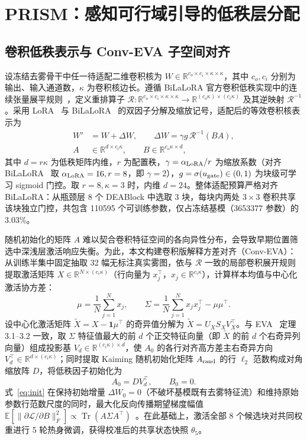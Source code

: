 \documentclass[10pt,twocolumn,letterpaper]{article}
\begin{document}
\section{PRISM：感知可行域引导的低秩层分配}
\subsection{卷积低秩表示与 Conv-EVA 子空间对齐}
设冻结去雾骨干中任一待适配二维卷积核为 $W\in\mathbb R^{c_o\times c_i\times\kappa\times\kappa}$，其中 $c_o,c_i$ 分别为输出、输入通道数，$\kappa$ 为卷积核边长。遵循 BiLaLoRA 官方卷积低秩实现中的连续张量展平规则~\cite{bilalora2026}，定义重排算子 $\mathcal R:\mathbb R^{c_o\times c_i\times\kappa\times\kappa}\to\mathbb R^{(c_o\kappa)\times(c_i\kappa)}$ 及其逆映射 $\mathcal R^{-1}$。采用 LoRA~\cite{lora2022} 与 BiLaLoRA~\cite{bilalora2026} 的双因子分解及缩放记号，适配后的等效卷积核表示为
\begin{equation}
\begin{aligned}
W'&=W+\Delta W,\qquad \Delta W=\gamma g\,\mathcal R^{-1}(BA),\\
A&\in\mathbb R^{d\times c_i\kappa},\qquad B\in\mathbb R^{c_o\kappa\times d},
\end{aligned}
\label{eq:lora}
\end{equation}
其中 $d=r\kappa$ 为低秩矩阵内维，$r$ 为配置秩，$\gamma=\alpha_{\rm LoRA}/r$ 为缩放系数（对齐 BiLaLoRA~\cite{bilalora2026} 取 $\alpha_{\rm LoRA}=16,r=8$，即 $\gamma=2$），$g=\sigma(u_{\rm gate})\in(0,1)$ 为块级可学习 sigmoid 门控。取 $r=8,\kappa=3$ 时，内维 $d=24$。整体适配预算严格对齐 BiLaLoRA：从瓶颈层 8 个 DEABlock 中选取 3 块，每块内两处 $3\times 3$ 卷积共享该块独立门控，共包含 110595 个可训练参数，仅占冻结基模（3653377 参数）的 3.03\%。

随机初始化的矩阵 $A$ 难以契合卷积特征空间的各向异性分布，会导致早期位置筛选中深浅层激活响应失衡。为此，本文构建卷积版解释方差对齐（Conv-EVA）：从训练半集中固定抽取 32 幅无标注真实雾图，依与 $\mathcal R$ 一致的局部卷积展开规则提取激活矩阵 $X\in\mathbb R^{N\times(c_i\kappa)}$（行向量为 $x_j^\top$，$x_j\in\mathbb R^{c_i\kappa}$），计算样本均值与中心化激活协方差：
\begin{equation}
\mu=\frac{1}{N}\sum_{j=1}^N x_j,\qquad
\Sigma=\frac{1}{N}\sum_{j=1}^N x_j x_j^\top-\mu\mu^\top.
\end{equation}
设中心化激活矩阵 $\tilde X=X-\mathbf 1\mu^\top$ 的奇异值分解为 $\tilde X=U_X S_X V_X^\top$。与 EVA~\cite{eva2025} 定理 3.1--3.2 一致，取 $\Sigma$ 特征值最大的前 $d$ 个正交特征向量（即 $\tilde X$ 的前 $d$ 个右奇异列向量）组成投影基 $V_d\in\mathbb R^{(c_i\kappa)\times d}$，使 $A_0$ 的各行对齐高方差主右奇异方向 $V_d^\top\in\mathbb R^{d\times(c_i\kappa)}$；同时提取 Kaiming 随机初始化矩阵 $A_{\rm rand}$ 的行 $\ell_2$ 范数构成对角缩放阵 $D$，将低秩因子初始化为
\begin{equation}
A_0=DV_d^\top,\qquad B_0=0.
\label{eq:init}
\end{equation}
式~\eqref{eq:init} 在保持初始增量 $\Delta W_0=0$（不破坏基模既有去雾特征流）和维持原始参数行范数尺度的同时，最大化反向传播期望梯度幅值 $\mathbb E[\|\partial\mathcal L/\partial B\|_F^2]\propto\operatorname{Tr}(A\Sigma A^\top)$~\cite{eva2025}。在此基础上，激活全部 8 个候选块对共同权重进行 5 轮热身微调，获得校准后的共享状态快照 $\theta_5$。
\end{document}
